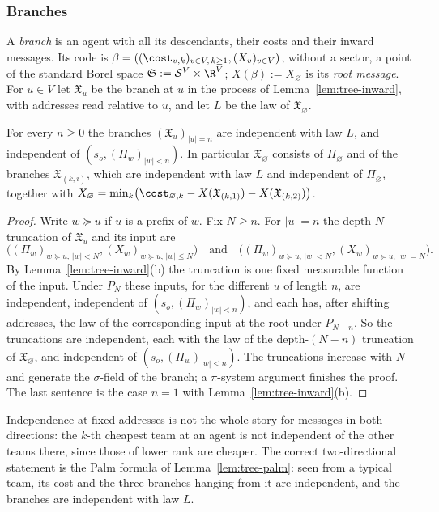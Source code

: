 \subsubsection*{Branches}

A \emph{branch} is an agent with all its descendants, their costs and their inward messages.
Its code is $\beta=((\cost_{v,k})_{v\in V,\,k\ge1},(X_v)_{v\in V})$, without a sector, a point
of the standard Borel space $\mathfrak{S}:=\mathcal{S}^V\times\R^V$; $X(\beta):=X_\varnothing$
is its \emph{root message}. For $u\in V$ let $\mathfrak{X}_u$ be the branch at $u$ in the
process of Lemma~\ref{lem:tree-inward}, with addresses read relative to $u$, and let $L$ be the
law of $\mathfrak{X}_\varnothing$.

\begin{lemma}\label{lem:tree-branches}
For every $n\ge0$ the branches $(\mathfrak{X}_u)_{|u|=n}$ are independent with law $L$, and
independent of $(s_o,(\Pi_w)_{|w|<n})$. In particular $\mathfrak{X}_\varnothing$ consists of
$\Pi_\varnothing$ and of the branches $\mathfrak{X}_{(k,i)}$, which are independent with law
$L$ and independent of $\Pi_\varnothing$, together with
$X_\varnothing=\min_k\bigl(\cost_{\varnothing,k}-X(\mathfrak{X}_{(k,1)})-X(\mathfrak{X}_{(k,2)})\bigr)$.
\end{lemma}

\begin{proof}
Write $w\succeq u$ if $u$ is a prefix of $w$. Fix $N\ge n$. For $|u|=n$ the depth-$N$
truncation of $\mathfrak{X}_u$ and its input are
\[
  \bigl((\Pi_w)_{w\succeq u,\,|w|<N},(X_w)_{w\succeq u,\,|w|\le N}\bigr)
  \quad\text{and}\quad
  \bigl((\Pi_w)_{w\succeq u,\,|w|<N},(X_w)_{w\succeq u,\,|w|=N}\bigr).
\]
By Lemma~\ref{lem:tree-inward}(b) the truncation is one fixed measurable function of the
input. Under $P_N$ these inputs, for the
different $u$ of length $n$, are independent, independent of $(s_o,(\Pi_w)_{|w|<n})$, and each
has, after shifting addresses, the law of the corresponding input at the root under $P_{N-n}$.
So the truncations are independent, each with the law of the depth-$(N-n)$ truncation of
$\mathfrak{X}_\varnothing$, and independent of $(s_o,(\Pi_w)_{|w|<n})$. The truncations
increase with $N$ and generate the $\sigma$-field of the branch; a $\pi$-system argument
finishes the proof. The last sentence is the case $n=1$ with Lemma~\ref{lem:tree-inward}(b).
\end{proof}

Independence at fixed addresses is not the whole story for messages in both directions: the
$k$-th cheapest team at an agent is not independent of the other teams there, since those of
lower rank are cheaper. The correct two-directional statement is the Palm formula of
Lemma~\ref{lem:tree-palm}: seen from a typical team, its cost and the three branches hanging
from it are independent, and the branches are independent with law $L$.

